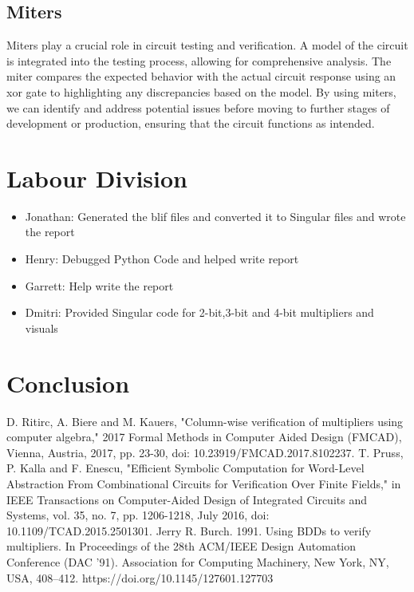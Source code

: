 \documentclass[conference]{IEEEtran}
\begin{document}
\subsection{Miters}
Miters play a crucial role in circuit testing and verification. A model of the circuit is integrated into 
the testing process, allowing for comprehensive analysis. The miter compares the expected behavior with 
the actual circuit response using an xor gate to highlighting any discrepancies based on the model. 
By using miters, we can identify and address potential issues before moving to further stages of development 
or production, ensuring that the circuit functions as intended.  

\section{Labour Division}
\begin{itemize}
    \item Jonathan: Generated the blif files and converted it to Singular files and wrote the report
    \item Henry: Debugged Python Code and helped write report
    \item Garrett: Help write the report
    \item Dmitri: Provided Singular code for 2-bit,3-bit and 4-bit multipliers and visuals
\end{itemize}

\section{Conclusion}


\begin{thebibliography}{03}
 D. Ritirc, A. Biere and M. Kauers, "Column-wise verification of multipliers using computer algebra," 2017 Formal Methods in Computer Aided Design (FMCAD), Vienna, Austria, 2017, pp. 23-30, doi: 10.23919/FMCAD.2017.8102237.
 T. Pruss, P. Kalla and F. Enescu, "Efficient Symbolic Computation for Word-Level Abstraction From Combinational Circuits for Verification Over Finite Fields," in IEEE Transactions on Computer-Aided Design of Integrated Circuits and Systems, vol. 35, no. 7, pp. 1206-1218, July 2016, doi: 10.1109/TCAD.2015.2501301.
 Jerry R. Burch. 1991. Using BDDs to verify multipliers. In Proceedings of the 28th ACM/IEEE Design Automation Conference (DAC '91). Association for Computing Machinery, New York, NY, USA, 408–412. https://doi.org/10.1145/127601.127703
\end{thebibliography}
\vspace{12pt}
\end{document}
